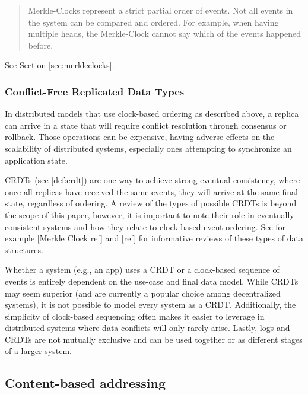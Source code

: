 \documentclass{comjnl}
\begin{document}
\begin{quote}
Merkle-Clocks represent a strict partial order of events. Not all events in the system can be compared and ordered. For example, when having multiple heads, the Merkle-Clock cannot say which of the events happened before.
\end{quote}

See Section \ref{sec:merkleclocks}.

\subsubsection{Conflict-Free Replicated Data Types}

In distributed models that use clock-based ordering as described above, a replica can arrive in a state that will require conflict resolution through consensus or rollback. Those operations can be expensive, having adverse effects on the scalability of distributed systems, especially ones attempting to synchronize an application state. 

CRDTs (see \ref{def:crdt}) are one way to achieve strong eventual consistency, where once all replicas have received the same events, they will arrive at the same final state, regardless of ordering. A review of the types of possible CRDTs is beyond the scope of this paper, however, it is important to note their role in eventually consistent systems and how they relate to clock-based event ordering. See for example [Merkle Clock ref] and [ref] for informative reviews of these types of data structures.

Whether a system (e.g., an app) uses a CRDT or a clock-based sequence of events is entirely dependent on the use-case and final data model. While CRDTs may seem superior (and are currently a popular choice among decentralized systems), it is not possible to model every system as a CRDT. Additionally, the simplicity of clock-based sequencing often makes it easier to leverage in distributed systems where data conflicts will only rarely arise. Lastly, logs and CRDTs are not mutually exclusive and can be used together or as different stages of a larger system.

\subsection{Content-based addressing}
\end{document}
